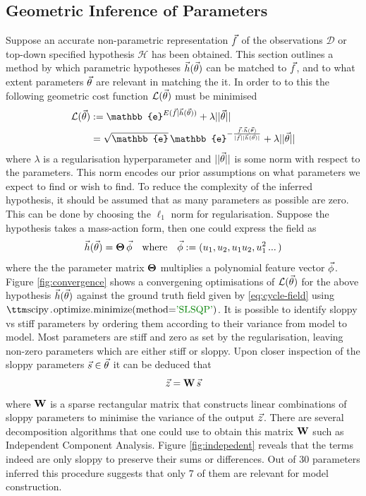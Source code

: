 \subsection{Geometric Inference of Parameters}
Suppose an accurate non-parametric representation $\vec{f}$ of the observations
$\mathcal{D}$ or top-down specified hypothesis $\mathcal{H}$ has been obtained.
This section outlines a method by which parametric hypotheses
$\vec{h}(\vec{\theta})$ can be matched to $\vec{f}$, and to what extent
parameters $\vec{\theta}$ are relevant in matching the it. In order to
to this the following geometric cost function $\mathcal{L}(\vec{\theta})$ must
be minimised
\begin{align}
    \mathcal{L}(\Vector{\theta}) &:= \mathbb{e}^{E(\Vector{f}|\Vector{h}(\Vector{\theta}))}
    +\lambda ||\Vector{\theta}||\\
    &= \sqrt{\mathbb{e}}\,
    \mathbb{e}^{-\frac{\Vector{f}\cdot\Vector{h}(\Vector{\theta})}
    {|\Vector{f}||\Vector{h}(\Vector{\theta})|}}
    +\lambda ||\Vector{\theta}||
\end{align}
where $\lambda$ is a regularisation hyperparameter and $||\vec{\theta}||$ is some
norm with respect to the parameters. This norm encodes our prior assumptions on
what parameters we expect to find or wish to find. To reduce the complexity of
the inferred hypothesis, it should be assumed that as many parameters as possible
are zero. This can be done by choosing the $\ell_1$ norm for regularisation. Suppose
the hypothesis takes a mass-action form, then one could express the field as
\begin{equation}
    \vec{h}(\vec{\theta})=\mathbf{\Theta}\,\vec{\phi}
    \quad\text{where}\quad\vec{\phi}:=(u_1, u_2, u_1 u_2, u_1^2\,...\, )
\end{equation}
where the the parameter matrix $\mathbf{\Theta}$ multiplies a polynomial feature
vector $\vec{\phi}$. Figure \ref{fig:convergence} shows a convergening optimisations
of $\mathcal{L}(\vec{\theta})$ for the above hypothesis $\vec{h}(\vec{\theta})$
against the ground truth field given by \eqref{eq:cycle-field} using $\pythoninline{scipy.optimize.minimize(method='SLSQP')}$. It is possible to identify sloppy
vs stiff parameters by ordering them according to their variance from model to model.
Most parameters are stiff and zero as set by the regularisation, leaving non-zero
parameters which are either stiff or sloppy. Upon closer inspection of the sloppy
parameters $\vec{s}\in\vec{\theta}$ it can be deduced that 
\begin{equation}
    \vec{z}=\mathbf{W}\,\vec{s}
\end{equation}
where $\mathbf{W}$ is a sparse rectangular matrix that constructs linear combinations
of sloppy parameters to minimise the variance of the output $\vec{z}$. There are
several decomposition algorithms that one could use to obtain this matrix $\mathbf{W}$
such as Independent Component Analysis. Figure \ref{fig:indepedent} reveals that
the terms indeed are only sloppy to preserve their sums or differences. Out of 30
parameters inferred this procedure suggests that only 7 of them are relevant for
model construction.

